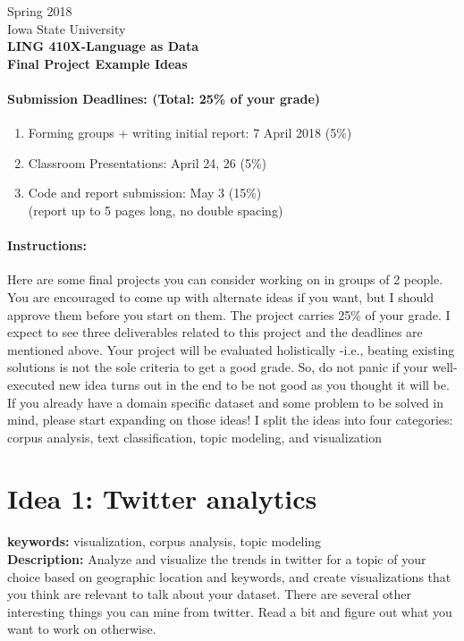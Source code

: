 \documentclass[11pt,a4paper]{article}
\begin{document}
\begin{center}
  Spring 2018 \\ Iowa State University\\[3ex]
  {\large \textbf{LING 410X-Language as Data}}\\[3ex]
  \textbf{Final Project Example Ideas} 
\end{center}

\paragraph{Submission Deadlines: (Total: 25\% of your grade)}
   \begin{enumerate}
   \item Forming groups + writing initial report: 7 April 2018 (5\%)
   \item Classroom Presentations: April 24, 26 (5\%)
   \item Code and report submission: May 3 (15\%)
\\ (report up to 5 pages long, no double spacing)
   \end{enumerate}

\paragraph{Instructions:} Here are some final projects you can consider working on in groups of 2 people. You are encouraged to come up with alternate ideas if you want, but I should approve them before you start on them. The project carries 25\% of your grade. I expect to see three deliverables related to this project and the deadlines are mentioned above. Your project will be evaluated holistically -i.e., beating existing solutions is not the sole criteria to get a good grade. So, do not panic if your well-executed new idea turns out in the end to be not good as you thought it will be. If you already have a domain specific dataset and some problem to be solved in mind, please start expanding on those ideas! I split the ideas into four categories: corpus analysis, text classification, topic modeling, and visualization

\section*{Idea 1: Twitter analytics}
\textbf{keywords: } visualization, corpus analysis, topic modeling
\\ \textbf{Description:} Analyze and visualize the trends in twitter for a topic of your choice based on geographic location and keywords, and create visualizations that you think are relevant to talk about your dataset. There are several other interesting things you can mine from twitter. Read a bit and figure out what you want to work on otherwise. 
\end{document}
